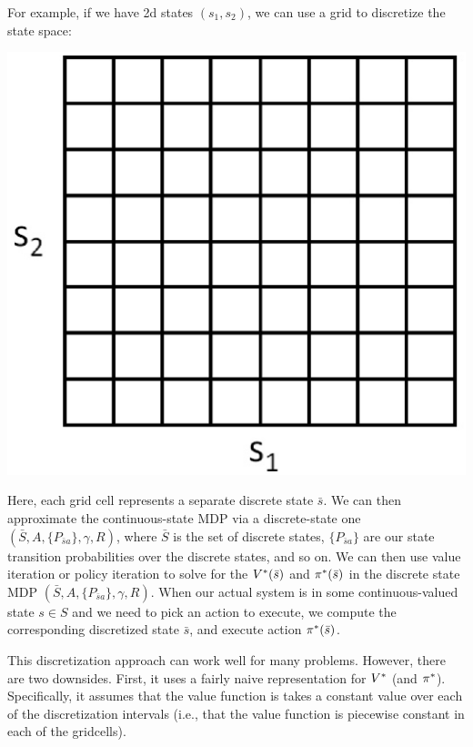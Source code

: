 \documentclass{article}
\newcommand{\Sbar}{\bar{S}}
\newcommand{\sbar}{\bar{s}}
\begin{document}
For example, if we have 2d states $(s_1, s_2)$, we can use a grid to discretize
the state space:
\begin{center}
\includegraphics[scale=0.3]{gridDiscretization.eps}
\end{center}
Here, each grid cell represents a separate discrete state $\sbar$.
We can then approximate the continuous-state MDP via a discrete-state one
$(\Sbar, A, \{P_{\sbar a}\}, \gamma, R)$, where $\Sbar$ is the set of
discrete states,
$\{P_{\sbar a}\}$ are our state transition probabilities over the discrete
states, and so on.  We can then use value iteration or policy iteration
to solve for the $\Vstar(\sbar)$ and $\pistar(\sbar)$ in the discrete state
MDP
$(\Sbar, A, \{P_{\sbar a}\}, \gamma, R)$.  When our actual system is in
some continuous-valued state $s \in S$ and we need to pick an action to execute, we compute the corresponding
discretized state $\sbar$, and execute action $\pistar(\sbar)$.

This discretization approach can work well for many problems.  However, there are
two downsides.  First, it uses a fairly naive representation
for ${V^{\ast}}$ (and ${\pi^{\ast}}$).  Specifically, it assumes that the value
function is takes a constant value over each of the discretization intervals
(i.e., that the value function is piecewise constant in each of the gridcells).
\end{document}
